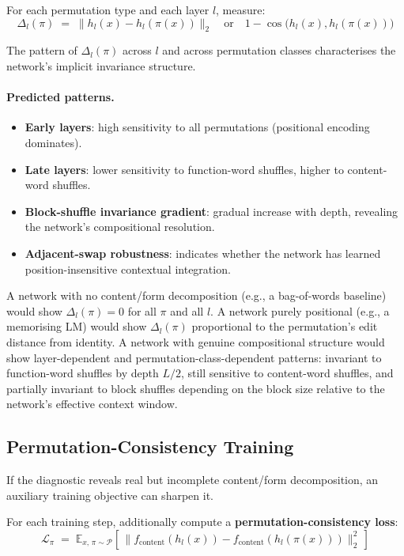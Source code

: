\documentclass[11pt, a4paper]{article}
\theoremstyle{plain}
\theoremstyle{definition}
\theoremstyle{remark}
\begin{document}
For each permutation type and each layer $l$, measure:
\begin{equation}
\Delta_l(\pi) \;=\; \big\| h_l(x) - h_l(\pi(x)) \big\|_2 \quad \text{or} \quad 1 - \cos\!\big(h_l(x), h_l(\pi(x))\big)
\end{equation}

The pattern of $\Delta_l(\pi)$ across $l$ and across permutation classes characterises the network's implicit invariance structure.

\paragraph{Predicted patterns.}
\begin{itemize}[nosep]
\item \textbf{Early layers}: high sensitivity to all permutations (positional encoding dominates).
\item \textbf{Late layers}: lower sensitivity to function-word shuffles, higher to content-word shuffles.
\item \textbf{Block-shuffle invariance gradient}: gradual increase with depth, revealing the network's compositional resolution.
\item \textbf{Adjacent-swap robustness}: indicates whether the network has learned position-insensitive contextual integration.
\end{itemize}

A network with no content/form decomposition (e.g., a bag-of-words baseline) would show $\Delta_l(\pi) = 0$ for all $\pi$ and all $l$.
A network purely positional (e.g., a memorising LM) would show $\Delta_l(\pi)$ proportional to the permutation's edit distance from identity.
A network with genuine compositional structure would show layer-dependent and permutation-class-dependent patterns: invariant to function-word shuffles by depth $L/2$, still sensitive to content-word shuffles, and partially invariant to block shuffles depending on the block size relative to the network's effective context window.

\subsection{Permutation-Consistency Training}

If the diagnostic reveals real but incomplete content/form decomposition, an auxiliary training objective can sharpen it.

For each training step, additionally compute a \textbf{permutation-consistency loss}:
\begin{equation}
\mathcal{L}_{\pi} \;=\; \mathbb{E}_{x,\, \pi \sim \mathcal{P}}\!\left[\, \big\| f_{\text{content}}(h_l(x)) - f_{\text{content}}(h_l(\pi(x))) \big\|_2^2\, \right]
\end{equation}
\end{document}
